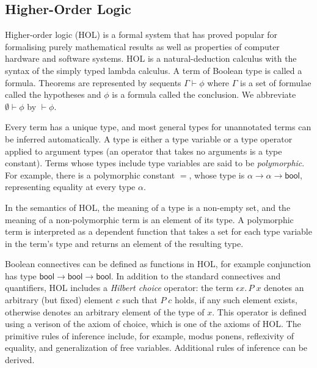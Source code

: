 \documentclass[twoside,titlepage,11pt]{article}
\begin{document}
\subsection{Higher-Order Logic}%
\newcommand{\bool}{\ensuremath{\mathsf{bool}}}
Higher-order logic (HOL) is a formal system that has proved popular for formalising purely mathematical results as well as properties of computer hardware and software systems.
HOL is a natural-deduction calculus with the syntax of the simply typed lambda calculus.
A term of Boolean type is called a formula.
Theorems are represented by sequents $\Gamma\vdash \phi$ where $\Gamma$ is a set of formulae called the hypotheses and $\phi$ is a formula called the conclusion.
We abbreviate $\emptyset\vdash\phi$ by $\vdash\phi$.%


Every term has a unique type, and most general types for unannotated terms can be inferred automatically.
A type is either a type variable or a type operator applied to argument types (an operator that takes no arguments is a type constant).
Terms whose types include type variables are said to be \emph{polymorphic}.
For example, there is a polymorphic constant $=$, whose type is $\alpha\to\alpha\to\bool$, representing equality at every type $\alpha$.

In the semantics of HOL, the meaning of a type is a non-empty set, and the meaning of a non-polymorphic term is an element of its type.
A polymorphic term is interpreted as a dependent function that takes a set for each type variable in the term's type and returns an element of the resulting type.

Boolean connectives can be defined as functions in HOL, for example conjunction has type $\bool\to\bool\to\bool$.
In addition to the standard connectives and quantifiers, HOL includes a \emph{Hilbert choice} operator: the term $\epsilon{x}.\,P\; x$ denotes an arbitrary (but fixed) element $c$ such that $P\; c$ holds, if any such element exists, otherwise denotes an arbitrary element of the type of $x$.
This operator is defined using a verison of the axiom of choice, which is one of the axioms of HOL.
The primitive rules of inference include, for example, modus ponens, reflexivity of equality, and generalization of free variables.
Additional rules of inference can be derived.
\end{document}
